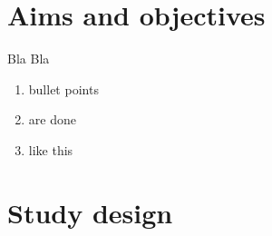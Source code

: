 
\section{Aims and objectives}

Bla Bla 

\begin{enumerate}
\item bullet points
\item are done 
\item like this 
\end{enumerate}

\section{Study design}
\lipsum
